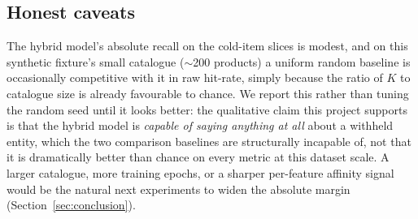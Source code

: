 \subsection{Honest caveats}

The hybrid model's absolute recall on the cold-item slices is modest, and
on this synthetic fixture's small catalogue ($\sim$200 products) a uniform
random baseline is occasionally competitive with it in raw hit-rate, simply
because the ratio of $K$ to catalogue size is already favourable to chance.
We report this rather than tuning the random seed until it looks better: the
qualitative claim this project supports is that the hybrid model is
\emph{capable of saying anything at all} about a withheld entity, which the
two comparison baselines are structurally incapable of, not that it is
dramatically better than chance on every metric at this dataset scale. A
larger catalogue, more training epochs, or a sharper per-feature affinity
signal would be the natural next experiments to widen the absolute margin
(Section~\ref{sec:conclusion}).
